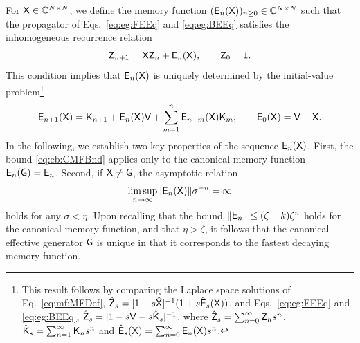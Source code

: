 \documentclass[aps,prl,reprint]{revtex4-2}
\begin{document}
For $\mathsf{X}\in\mathbb{C}^{N\times N}$, we define the memory function $(\mathsf{E}_n(\mathsf{X}))_{n\geq 0}\in\mathbb{C}^{N\times N}$ such that the propagator of Eqs.~\eqref{eq:eg:FEEq} and \eqref{eq:eg:BEEq} satisfies the inhomogeneous recurrence relation
\begin{equation}\label{eq:mf:MFDef}
\mathsf{Z}_{n+1} = \mathsf{X}\mathsf{Z}_n + \mathsf{E}_n(\mathsf{X}), \qquad \mathsf{Z}_0 = \mathsf{1}.
\end{equation}
This condition implies that $\mathsf{E}_n(\mathsf{X})$ is uniquely determined by the initial-value problem\footnote{This result follows by comparing the Laplace space solutions of Eq.~\eqref{eq:mf:MFDef}, $\hat{\mathsf{Z}}_s= [1-s\hat{\mathsf{X}}]^{-1}(1+s\hat{\mathsf{E}}_s(\mathsf{X}))$, and Eqs.~\eqref{eq:eg:FEEq} and \eqref{eq:eg:BEEq}, $\hat{\mathsf{Z}}_s= [1-s\mathsf{V}-s\hat{\mathsf{K}}_s]^{-1}$, where $\hat{\mathsf{Z}}_s =\sum_{n=0}^\infty\mathsf{Z}_n s^n$, $\hat{\mathsf{K}}_s = \sum_{n=1}^\infty \mathsf{K}_n s^n$ and $\hat{\mathsf{E}}_s(\mathsf{X})= \sum_{n=0}^\infty \mathsf{E}_n(\mathsf{X})s^n$.}
\begin{equation}\label{eq:mf:MFRec}
\mathsf{E}_{n+1}(\mathsf{X}) = \mathsf{K}_{n+1} + \mathsf{E}_n(\mathsf{X})\mathsf{V} + \sum_{m=1}^n\mathsf{E}_{n-m}(\mathsf{X})\mathsf{K}_m,
\qquad \mathsf{E}_0(\mathsf{X}) = \mathsf{V} - \mathsf{X}.
\end{equation}
In the following, we establish two key properties of the sequence $\mathsf{E}_n(\mathsf{X})$.
First, the bound \eqref{eq:eb:CMFBnd} applies only to the canonical memory function $\mathsf{E}_n(\mathsf{G}) = \mathsf{E}_n$.
Second, if $\mathsf{X}\neq\mathsf{G}$, the asymptotic relation
\begin{equation}
\limsup_{n\rightarrow\infty} \lVert \mathsf{E}_n(\mathsf{X}) \rVert\sigma^{-n} = \infty
\end{equation}
holds for any $\sigma<\eta$.
Upon recalling that the bound $\lVert \mathsf{E}_n \rVert\leq (\zeta-k)\zeta^n$ holds for the canonical memory function, and that $\eta>\zeta$, it follows that the canonical effective generator $\mathsf{G}$ is unique in that it corresponds to the fastest decaying memory function.
\end{document}
